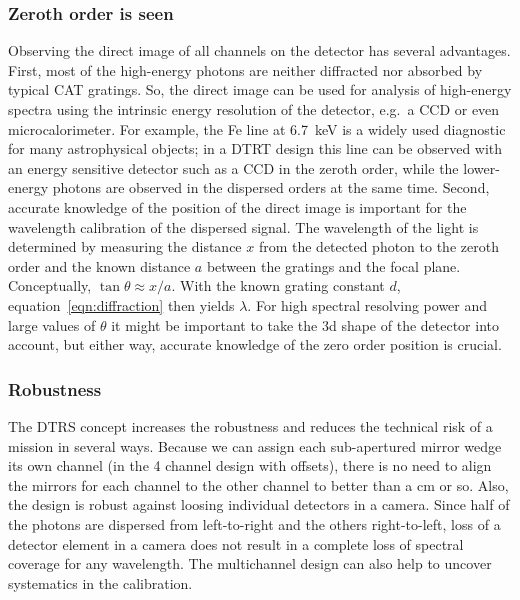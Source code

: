 \documentclass[linenumbers]{aastex631}
\begin{document}
\subsubsection{Zeroth order is seen}
Observing the direct image of all channels on the detector has several advantages. First, most of the high-energy photons are neither diffracted nor absorbed by typical CAT gratings. So, the direct image can be used for analysis of high-energy spectra using the intrinsic energy resolution of the detector, e.g.\ a CCD or even microcalorimeter. For example, the Fe line at 6.7~keV is a widely used diagnostic for many astrophysical objects; in a DTRT design this line can be observed with an energy sensitive detector such as a CCD in the zeroth order, while the lower-energy photons are observed in the dispersed orders at the same time. Second, accurate knowledge of the position of the direct image is important for the wavelength calibration of the dispersed signal. The wavelength of the light is determined by measuring the distance $x$ from the detected photon to the zeroth order and the known distance $a$ between the gratings and the focal plane. Conceptually, $\tan \theta \approx x/a$. With the known grating constant $d$, equation~\ref{eqn:diffraction} then yields $\lambda$. For high spectral resolving power and large values of $\theta$ it might be important to take the 3d shape of the detector into account, but either way, accurate knowledge of the zero order position is crucial.


\subsubsection{Robustness}
The DTRS concept increases the robustness and reduces the technical risk of a mission in several ways. Because we can assign each sub-apertured mirror wedge its own channel (in the 4 channel design with offsets), there is no need to align the mirrors for each channel to the other channel to better than a cm or so.
Also, the design is robust against loosing individual detectors in a camera. Since half of the photons are dispersed from left-to-right and the others right-to-left, loss of a detector element in a camera does not result in a complete loss of spectral coverage for any wavelength. The multichannel design can also help to uncover systematics in the calibration.


\end{document}
